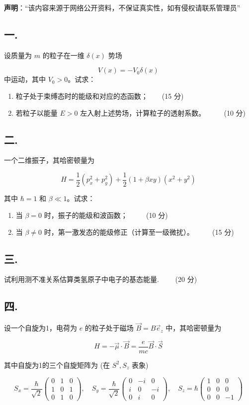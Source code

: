 
\textbf{声明}：“该内容来源于网络公开资料，不保证真实性，如有侵权请联系管理员”

\subsection{一.}
设质量为 $m$ 的粒子在一维 $\delta(x)$ 势场

\[
V(x) = -V_0 \delta(x)~
\]
中运动，其中 $V_0 > 0$。试求：

\begin{enumerate}
    \item 粒子处于束缚态时的能级和对应的态函数；$\qquad $(15 分)
    \item 若粒子以能量 $E > 0$ 左入射上述势场，计算粒子的透射系数。 $\qquad $ (10 分)
\end{enumerate}
\subsection{二.}
 一个二维振子，其哈密顿量为

\[
H = \frac{1}{2} (p_x^2 + p_y^2) + \frac{1}{2} (1 + \beta xy)(x^2 + y^2)~
\]

其中 $\hbar = 1$ 和 $\beta \ll 1$。试求：

\begin{enumerate}
    \item 当 $\beta = 0$ 时，振子的能级和波函数； $\qquad $ (10 分)
    \item 当 $\beta \neq 0$ 时，第一激发态的能级修正（计算至一级微扰）。 $\qquad $ (15 分)
\end{enumerate}
\subsection{三.}
试利用测不准关系估算类氢原子中电子的基态能量.$\qquad $ (20 分)
\subsection{四.}
设一个自旋为1，电荷为 $e$ 的粒子处于磁场 $\vec{B} = B\vec{e}_z$ 中，其哈密顿量为

\[
H = -\vec{\mu} \cdot \vec{B} = \frac{e}{mc} \vec{B} \cdot \vec{S}~
\]

其中自旋为1的三个自旋矩阵为 (在 $S^2, S_z$ 表象)

\[
S_x = \frac{\hbar}{\sqrt{2}}
\begin{pmatrix}
0 & 1 & 0 \\
1 & 0 & 1 \\
0 & 1 & 0
\end{pmatrix}
, \quad
S_y = \frac{\hbar}{\sqrt{2}}
\begin{pmatrix}
0 & -i & 0 \\
i & 0 & -i \\
0 & i & 0
\end{pmatrix}
, \quad
S_z = \hbar
\begin{pmatrix}
1 & 0 & 0 \\
0 & 0 & 0 \\
0 & 0 & -1
\end{pmatrix}~
\]

